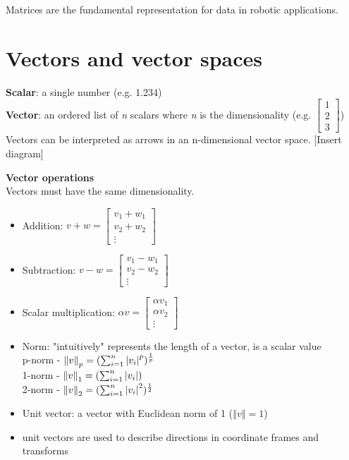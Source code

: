 \documentclass[../main.tex]{subfiles}
\begin{document}
  Matrices are the fundamental representation for data in robotic applications.

  \section{Vectors and vector spaces}

  \textbf{Scalar}: a single number (e.g. 1.234) \\
  \textbf{Vector}: an ordered list of \textit{n} scalars where \textit{n} is the dimensionality (e.g. $\begin{bmatrix} 1 \\ 2 \\ 3 \end{bmatrix}$) \\
  Vectors can be interpreted as arrows in an n-dimensional vector space. [Insert diagram]

  \textbf{Vector operations} \\
  Vectors must have the same dimensionality.
  \begin{itemize}
      \item Addition: $v + w = \begin{bmatrix} v_{1} + w_{1} \\ v_{2} + w_{2} \\ \vdots \end{bmatrix}$
      \item Subtraction: $v - w = \begin{bmatrix} v_{1} - w_{1} \\ v_{2} - w_{2} \\ \vdots \end{bmatrix}$
      \item Scalar multiplication: $\alpha v = \begin{bmatrix} \alpha v_{1} \\ \alpha v_{2} \\ \vdots \end{bmatrix}$
      \item Norm: "intuitively" represents the length of a vector, is a scalar value \\
      p-norm - $\left\Vert v \right\Vert_{p} = (\sum_{i=1}^{n} \left|v_{i}\right|^{p})^{\frac{1}{p}}$ \\
      1-norm - $\left\Vert v \right\Vert_{1} = (\sum_{i=1}^{n} \left|v_{i}\right|)$ \\
      2-norm - $\left\Vert v \right\Vert_{2} = (\sum_{i=1}^{n} \left|v_{i}\right|^{2})^{\frac{1}{2}}$
      \item Unit vector: a vector with Euclidean norm of 1 ($\left\Vert v \right\Vert = 1$)
      \item \indent unit vectors are used to describe directions in coordinate frames and transforms
  \end{itemize}
\end{document}
